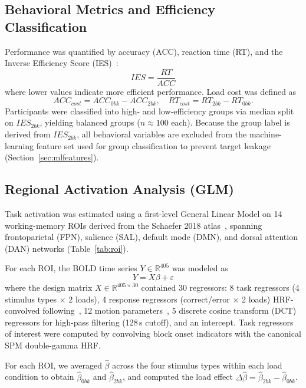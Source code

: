 \documentclass[conference]{IEEEtran}
\begin{document}
\subsection{Behavioral Metrics and Efficiency Classification}
Performance was quantified by accuracy (ACC), reaction time (RT), and the Inverse Efficiency Score (IES)~\cite{townsend2014methods}:
\begin{equation}
IES = \frac{RT}{ACC}
\end{equation}
where lower values indicate more efficient performance. Load cost was defined as
\begin{equation}
ACC_{cost}=ACC_{0bk}-ACC_{2bk}, \quad RT_{cost}=RT_{2bk}-RT_{0bk}.
\end{equation}
Participants were classified into high- and low-efficiency groups via median split on $IES_{2bk}$, yielding balanced groups ($n \approx 100$ each). Because the group label is derived from $IES_{2bk}$, all behavioral variables are excluded from the machine-learning feature set used for group classification to prevent target leakage (Section~\ref{sec:mlfeatures}).

\subsection{Regional Activation Analysis (GLM)}
Task activation was estimated using a first-level General Linear Model on 14 working-memory ROIs derived from the Schaefer 2018 atlas~\cite{schaefer2018local}, spanning frontoparietal (FPN), salience (SAL), default mode (DMN), and dorsal attention (DAN) networks (Table~\ref{tab:roi}).

For each ROI, the BOLD time series $Y \in \mathbb{R}^{405}$ was modeled as
\begin{equation}
Y = X \beta + \varepsilon
\end{equation}
where the design matrix $X \in \mathbb{R}^{405 \times 30}$ contained 30 regressors: 8 task regressors (4 stimulus types $\times$ 2 loads), 4 response regressors (correct/error $\times$ 2 loads) HRF-convolved following~\cite{friston1998event}, 12 motion parameters~\cite{friston1996movement}, 5 discrete cosine transform (DCT) regressors for high-pass filtering (128\,s cutoff), and an intercept. Task regressors of interest were computed by convolving block onset indicators with the canonical SPM double-gamma HRF.

For each ROI, we averaged $\hat{\beta}$ across the four stimulus types within each load condition to obtain $\hat{\beta}_{0bk}$ and $\hat{\beta}_{2bk}$, and computed the load effect $\Delta\hat{\beta}=\hat{\beta}_{2bk}-\hat{\beta}_{0bk}$.
\end{document}
